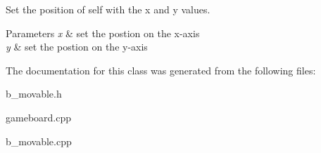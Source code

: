 Set the position of self with the x and y values. 


\begin{DoxyParams}{Parameters}
{\em x} & set the postion on the x-\/axis \\
\hline
{\em y} & set the postion on the y-\/axis \\
\hline
\end{DoxyParams}


The documentation for this class was generated from the following files\+:\begin{DoxyCompactItemize}
\item 
b\+\_\+movable.\+h\item 
gameboard.\+cpp\item 
b\+\_\+movable.\+cpp\end{DoxyCompactItemize}
